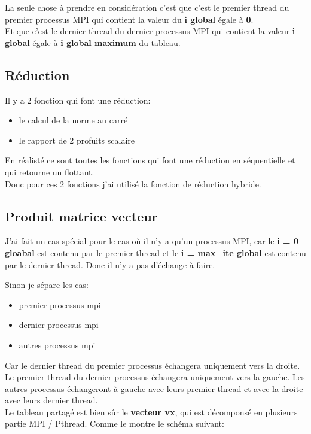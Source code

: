 \documentclass[12pt, letterpaper]{article}
\begin{document}
La seule chose à prendre en considération c'est que c'est le premier thread
du premier processus MPI qui contient la valeur du \textbf{i global} égale à \textbf{0}.
\\
Et que c'est le dernier thread du dernier processus MPI qui contient la
valeur \textbf{i global} égale à \textbf{i global maximum} du tableau.

\subsection{Réduction}
\label{sec:org0b2467b}

Il y a 2 fonction qui font une réduction:
\begin{itemize}
\item le calcul de la norme au carré
\item le rapport de 2 profuits scalaire
\end{itemize}


En réalisté ce sont toutes les fonctions qui font une réduction en
séquentielle et qui retourne un flottant.
\\
Donc pour ces 2 fonctions j'ai utilisé la fonction de réduction hybride.

\subsection{Produit matrice vecteur}
\label{sec:org9ca3773}

J'ai fait un cas spécial pour le cas où il n'y a qu'un processus MPI, car le
\textbf{i = 0 gloabal} est contenu par le premier thread et le \textbf{i = max\_ite global}
est contenu par le dernier thread. Donc il n'y a pas d'échange à faire.

Sinon je sépare les cas:
\begin{itemize}
\item premier processus mpi
\item dernier processus mpi
\item autres processus mpi
\end{itemize}


Car le dernier thread du premier processus échangera uniquement vers la
droite.
Le premier thread du dernier processus échangera uniquement vers la gauche.
Les autres processus échangeront à gauche avec leurs premier thread et avec
la droite avec leurs dernier thread.
\\
Le tableau partagé est bien sûr le \textbf{vecteur vx}, qui est décomponsé en
plusieurs partie MPI / Pthread. Comme le montre le schéma suivant:
\end{document}
